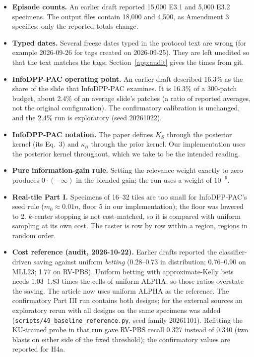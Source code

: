 \documentclass[11pt]{article}
\theoremstyle{remark}
\theoremstyle{definition}
\begin{document}
\begin{itemize}
\item \textbf{Episode counts.} An earlier draft reported 15,000 E3.1 and 5,000 E3.2 specimens. The output files contain 18,000 and 4,500, as Amendment 3 specifies; only the reported totals change.
\item \textbf{Typed dates.} Several freeze dates typed in the protocol text are wrong (for example 2026-09-26 for tags created on 2026-09-25). They are left unedited so that the text matches the tags; Section~\ref{app:audit} gives the times from git.
\item \textbf{InfoDPP-PAC operating point.} An earlier draft described 16.3\% as the share of the slide that InfoDPP-PAC examines. It is 16.3\% of a 300-patch budget, about 2.4\% of an average slide's patches (a ratio of reported averages, not the original configuration). The confirmatory calibration is unchanged, and the 2.4\% run is exploratory (seed 20261022).
\item \textbf{InfoDPP-PAC notation.} The paper defines $K_S$ through the posterior kernel (its Eq.~3) and $\kappa_{ii}$ through the prior kernel. Our implementation uses the posterior kernel throughout, which we take to be the intended reading.
\item \textbf{Pure information-gain rule.} Setting the relevance weight exactly to zero produces $0\cdot(-\infty)$ in the blended gain; the run uses a weight of $10^{-9}$.
\item \textbf{Real-tile Part I.} Specimens of 16--32 tiles are too small for InfoDPP-PAC's seed rule ($m_0\approx0.01n$, floor 5 in our implementation); the floor was lowered to 2. $k$-center stopping is not cost-matched, so it is compared with uniform sampling at its own cost. The raster is row by row within a region, regions in random order.
\item \textbf{Cost reference (audit, 2026-10-22).} Earlier drafts reported the classifier-driven saving against uniform \emph{betting} (0.28--0.73 in distribution; 0.76--0.90 on MLL23; 1.77 on RV-PBS). Uniform betting with approximate-Kelly bets needs 1.03--1.83 times the cells of uniform ALPHA, so those ratios overstate the saving. The article now uses uniform ALPHA as the reference. The confirmatory Part III run contains both designs; for the external sources an exploratory rerun with all designs on the same specimens was added (\texttt{scripts/49\_baseline\_reference.py}, seed family 20261101). Refitting the KU-trained probe in that run gave RV-PBS recall 0.327 instead of 0.340 (two blasts on either side of the fixed threshold); the confirmatory values are reported for H4a.

\end{itemize}
\end{document}
